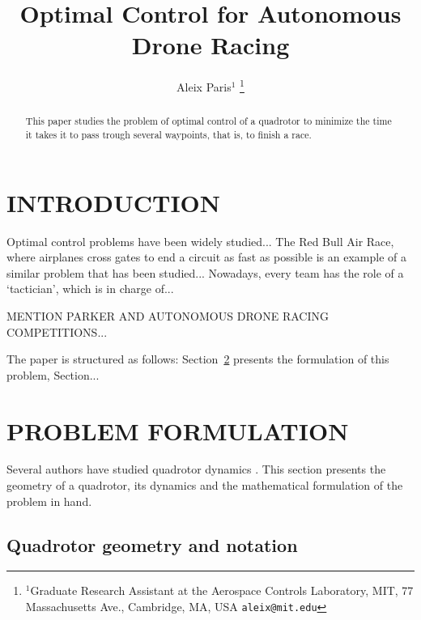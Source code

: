 \documentclass[letterpaper, 10 pt, conference]{ieeeconf}  %
\title{\LARGE \bf
Optimal Control for Autonomous Drone Racing
}
\author{Aleix Paris$^{1}$%
\thanks{$^{1}$Graduate Research Assistant at the Aerospace Controls Laboratory,
        MIT, 77 Massachusetts Ave., Cambridge, MA, USA
        {\tt\small aleix@mit.edu}}%
}
\begin{document}
\maketitle
\thispagestyle{empty}
\pagestyle{empty}


\begin{abstract}

This paper studies the problem of optimal control of a quadrotor to minimize the time it takes it to pass trough several waypoints, that is, to finish a race.

\end{abstract}


\section{INTRODUCTION}\label{s:intro}

Optimal control problems have been widely studied...
The Red Bull Air Race, where airplanes cross gates to end a circuit as fast as possible is an example of a similar problem that has been studied... Nowadays, every team has the role of a `tactician', which is in charge of...

MENTION PARKER AND AUTONOMOUS DRONE RACING COMPETITIONS...

The paper is structured as follows: Section~\ref{s:problem} presents the formulation of this problem, Section...


\section{PROBLEM FORMULATION}\label{s:problem}

Several authors have studied quadrotor dynamics \cite{IEEEexample:article_typical}.%
This section presents the geometry of a quadrotor, its dynamics and the mathematical formulation of the problem in hand.

\subsection{Quadrotor geometry and notation}
\end{document}
